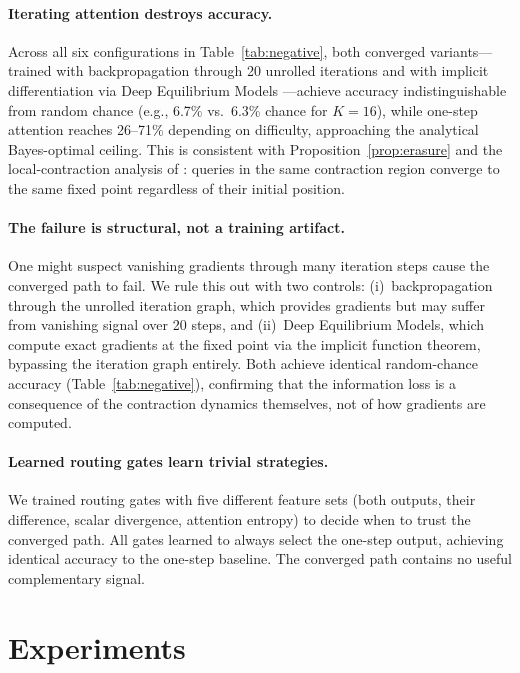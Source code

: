 \documentclass{article}
\theoremstyle{definition}
\begin{document}
\paragraph{Iterating attention destroys accuracy.}
Across all six configurations in Table~\ref{tab:negative}, both converged variants---trained with backpropagation through 20 unrolled iterations and with implicit differentiation via Deep Equilibrium Models \citep{bai2019deep}---achieve accuracy indistinguishable from random chance (e.g., 6.7\% vs.\ 6.3\% chance for $K{=}16$), while one-step attention reaches 26--71\% depending on difficulty, approaching the analytical Bayes-optimal ceiling.
This is consistent with Proposition~\ref{prop:erasure} and the local-contraction analysis of \citet{ramsauer2021hopfield}: queries in the same contraction region converge to the same fixed point regardless of their initial position.

\paragraph{The failure is structural, not a training artifact.}
One might suspect vanishing gradients through many iteration steps cause the converged path to fail.
We rule this out with two controls: (i)~backpropagation through the unrolled iteration graph, which provides gradients but may suffer from vanishing signal over 20 steps, and (ii)~Deep Equilibrium Models, which compute exact gradients at the fixed point via the implicit function theorem, bypassing the iteration graph entirely.
Both achieve identical random-chance accuracy (Table~\ref{tab:negative}), confirming that the information loss is a consequence of the contraction dynamics themselves, not of how gradients are computed.

\paragraph{Learned routing gates learn trivial strategies.}
We trained routing gates with five different feature sets (both outputs, their difference, scalar divergence, attention entropy) to decide when to trust the converged path.
All gates learned to always select the one-step output, achieving identical accuracy to the one-step baseline.
The converged path contains no useful complementary signal.


\section{Experiments}
\label{sec:experiments}
\end{document}
